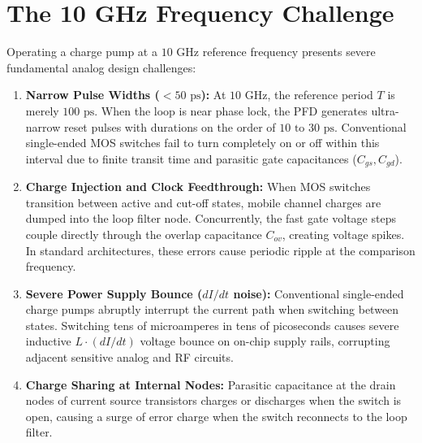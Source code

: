\documentclass[11pt,a4paper]{report}
\begin{document}
\section{The 10 GHz Frequency Challenge}
Operating a charge pump at a $10\text{ GHz}$ reference frequency presents severe fundamental analog design challenges:
\begin{enumerate}[label=\textbf{\arabic*.}]
    \item \textbf{Narrow Pulse Widths ($<50\text{ ps}$):} At $10\text{ GHz}$, the reference period $T$ is merely $100\text{ ps}$. When the loop is near phase lock, the PFD generates ultra-narrow reset pulses with durations on the order of $10\text{ to }30\text{ ps}$. Conventional single-ended MOS switches fail to turn completely on or off within this interval due to finite transit time and parasitic gate capacitances ($C_{gs}, C_{gd}$).
    \item \textbf{Charge Injection and Clock Feedthrough:} When MOS switches transition between active and cut-off states, mobile channel charges are dumped into the loop filter node. Concurrently, the fast gate voltage steps couple directly through the overlap capacitance $C_{ov}$, creating voltage spikes. In standard architectures, these errors cause periodic ripple at the comparison frequency.
    \item \textbf{Severe Power Supply Bounce ($dI/dt$ noise):} Conventional single-ended charge pumps abruptly interrupt the current path when switching between states. Switching tens of microamperes in tens of picoseconds causes severe inductive $L \cdot (dI/dt)$ voltage bounce on on-chip supply rails, corrupting adjacent sensitive analog and RF circuits.
    \item \textbf{Charge Sharing at Internal Nodes:} Parasitic capacitance at the drain nodes of current source transistors charges or discharges when the switch is open, causing a surge of error charge when the switch reconnects to the loop filter.
\end{enumerate}
\end{document}
